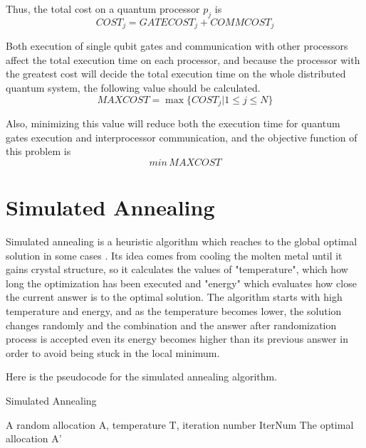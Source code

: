 Thus, the total cost on a quantum processor $p_j$ is 
$$COST_j = GATECOST_j + COMMCOST_j$$

Both execution of single qubit gates and communication with other processors affect the total execution time on each processor, and because the processor with the greatest cost will decide the total execution time on the whole distributed quantum system, the following value should be calculated.
$$MAXCOST = \max \{COST_j | 1 \leq j \leq N\}$$

Also, minimizing this value will reduce both the execution time for quantum gates execution and interprocessor communication, and the objective function of this problem is 
$$ min\,MAXCOST$$

\newpage

\section{Simulated Annealing}
Simulated annealing is a heuristic algorithm which reaches to the global optimal solution in some cases \cite{simulatedannealing, Boltzmann}. Its idea comes from cooling the molten metal until it gains crystal structure, so it calculates the values of "temperature", which how long the optimization has been executed and "energy" which evaluates how close the current answer is to the optimal solution.  The algorithm starts with high temperature and energy, and as the temperature becomes lower,  the solution changes randomly and the combination and the answer after randomization process is accepted even its energy becomes higher than its previous answer in order to avoid being stuck in the local minimum.

Here is the pseudocode for the simulated annealing algorithm.

\begin{algorithm}
 \caption{Simulated Annealing}
  \begin{algorithmic}[1]
  \Require A random allocation A, temperature T, iteration number IterNum
  \Ensure The optimal allocation A'
    \EndIf
 \EndFor
\EndFunction
 \end{algorithmic}
 \end{algorithm}
 
